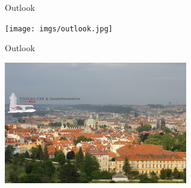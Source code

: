\documentclass{beamer}
\begin{document}
%
%
%
%
%
%
%
%
%
%
%

\begin{frame}{Outlook}{}
  \begin{center}
    \texttt{[image: imgs/outlook.jpg]}

  \end{center}
\end{frame}

\begin{frame}{Outlook}{}
  \begin{center}
    \includegraphics[height=200px]{imgs/outlook1.jpg}

  \end{center}
\end{frame}
\end{document}
